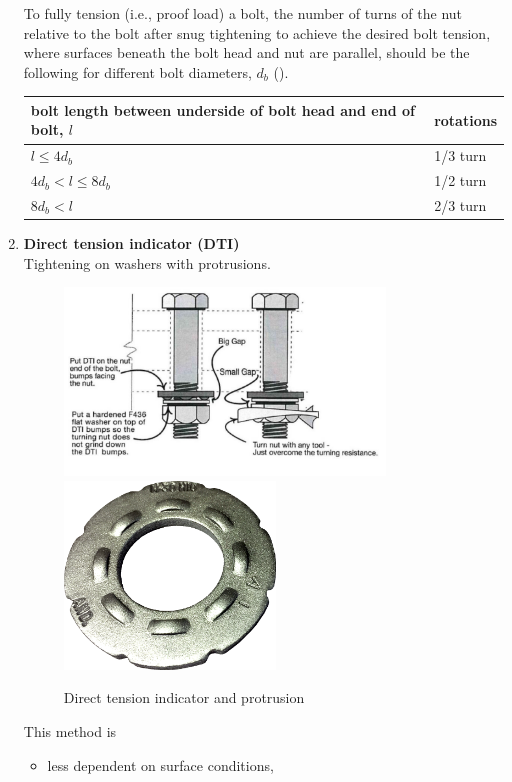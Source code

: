 \begin{enumerate}
To fully tension (i.e., proof load) a bolt, the number of turns of the nut relative to the bolt after snug tightening to achieve the desired bolt tension, where surfaces beneath the bolt head and nut are parallel, should be the following for different bolt diameters, $d_b$ ().
\begin{center}
\begin{tabular}{ll}
    \toprule
    bolt length between underside of bolt head and end of bolt, $l$ & rotations \\ \midrule
    $l\leqslant4d_b$                                                & 1/3 turn  \\
    $4d_b<l\leqslant8d_b$                                           & 1/2 turn  \\
    $8d_b<l$                                                        & 2/3 turn  \\ \bottomrule
\end{tabular}
\end{center}
\item \textbf{Direct tension indicator (DTI)}\\Tightening on washers with protrusions.
\begin{figure}[H]
\centering\includegraphics[height=5cm]{PIC/CH06/DTI}
\includegraphics[height=5cm]{PIC/CH06/PRO}
\caption{Direct tension indicator and protrusion}
\end{figure}
This method is
\begin{itemize}
\item less dependent on surface conditions,

\end{itemize}
\end{enumerate}

